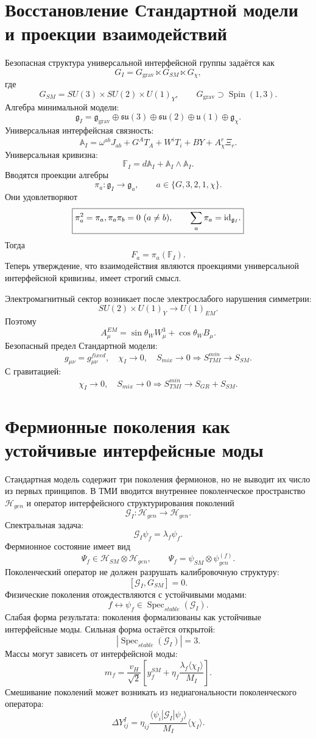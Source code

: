 \documentclass[12pt,a4paper]{article}
\DeclareMathOperator{\Spin}{Spin}
\DeclareMathOperator{\Spec}{Spec}
\newcommand{\Hilb}{\mathcal H}
\newcommand{\Acal}{\mathbb A_I}
\newcommand{\Fcal}{\mathbb F_I}
\begin{document}
\section{Восстановление Стандартной модели и проекции взаимодействий}
Безопасная структура универсальной интерфейсной группы задаётся как
\[
\boxed{G_I=G_{\mathrm{grav}}\ltimes G_{SM}\ltimes G_\chi,}
\]
где
\[
\boxed{G_{SM}=SU(3)\times SU(2)\times U(1)_Y,\qquad G_{\mathrm{grav}}\supset\Spin(1,3).}
\]
Алгебра минимальной модели:
\[
\boxed{\mathfrak g_I=\mathfrak g_{\mathrm{grav}}\oplus\mathfrak{su}(3)\oplus\mathfrak{su}(2)\oplus\mathfrak u(1)\oplus\mathfrak g_\chi.}
\]
Универсальная интерфейсная связность:
\[
\boxed{\Acal=\omega^{ab}J_{ab}+G^AT_A+W^iT_i+BY+A_\chi^r\Xi_r.}
\]
Универсальная кривизна:
\[
\boxed{\Fcal=d\Acal+\Acal\wedge\Acal.}
\]
Вводятся проекции алгебры
\[
\boxed{\pi_a:\mathfrak g_I\to\mathfrak g_a,
\qquad a\in\{G,3,2,1,\chi\}.}
\]
Они удовлетворяют
\[
\boxed{\pi_a^2=\pi_a,\\ \pi_a\pi_b=0\ (a\ne b),\qquad \sum_a\pi_a=\mathrm{id}_{\mathfrak g_I}.}
\]
Тогда
\[
\boxed{F_a=\pi_a(\Fcal).}
\]
Теперь утверждение, что взаимодействия являются проекциями универсальной интерфейсной кривизны, имеет строгий смысл.

Электромагнитный сектор возникает после электрослабого нарушения симметрии:
\[
\boxed{SU(2)\times U(1)_Y\to U(1)_{EM}.}
\]
Поэтому
\[
\boxed{A_\mu^{EM}=\sin\theta_W W_\mu^3+\cos\theta_WB_\mu.}
\]
Безопасный предел Стандартной модели:
\[
\boxed{g_{\mu\nu}=g_{\mu\nu}^{fixed},\quad \chi_I\to0,
\quad S_{mix}\to0\Rightarrow S_{TMI}^{min}\to S_{SM}.}
\]
С гравитацией:
\[
\boxed{\chi_I\to0,
\quad S_{mix}\to0\Rightarrow S_{TMI}^{min}\to S_{GR}+S_{SM}.}
\]

\section{Фермионные поколения как устойчивые интерфейсные моды}
Стандартная модель содержит три поколения фермионов, но не выводит их число из первых принципов. В ТМИ вводится внутреннее поколенческое пространство $\Hilb_{gen}$ и оператор интерфейсного структурирования поколений
\[
\boxed{\mathcal G_I:\Hilb_{gen}\to\Hilb_{gen}.}
\]
Спектральная задача:
\[
\boxed{\mathcal G_I\psi_f=\lambda_f\psi_f.}
\]
Фермионное состояние имеет вид
\[
\boxed{\Psi_f\in\Hilb_{SM}\otimes\Hilb_{gen},
\qquad \Psi_f=\psi_{SM}\otimes\psi_{gen}^{(f)}.}
\]
Поколенческий оператор не должен разрушать калибровочную структуру:
\[
\boxed{[\mathcal G_I,G_{SM}]=0.}
\]
Физические поколения отождествляются с устойчивыми модами:
\[
\boxed{f\leftrightarrow\psi_f\in\Spec_{stable}(\mathcal G_I).}
\]
Слабая форма результата: поколения формализованы как устойчивые интерфейсные моды. Сильная форма остаётся открытой:
\[
\boxed{|\Spec_{stable}(\mathcal G_I)|=3.}
\]
Массы могут зависеть от интерфейсной моды:
\[
\boxed{m_f=\frac{v_H}{\sqrt2}\left[y_f^{SM}+\eta_f\frac{\lambda_f\langle\chi_I\rangle}{M_I}\right].}
\]
Смешивание поколений может возникать из недиагональности поколенческого оператора:
\[
\boxed{\Delta Y_{ij}^{I}=\eta_{ij}\frac{\langle\psi_i|\mathcal G_I|\psi_j\rangle}{M_I}\langle\chi_I\rangle.}
\]
\end{document}
